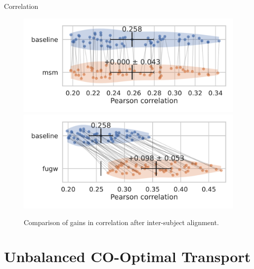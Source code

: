 \documentclass{beamer}
\begin{document}
\begin{frame}{Correlation}

  \begin{figure}
    \centering
    \includegraphics[width=0.49\linewidth, keepaspectratio=true]{OT_new/fsaverage5_alignment_correlation_gain_msm.pdf}
    \includegraphics[width=0.49\linewidth, keepaspectratio=true]{OT_new/fsaverage5_alignment_correlation_gain_fugw.pdf}
    \caption*{\scriptsize{Comparison of gains in correlation after inter-subject alignment.}}
  \end{figure}
\end{frame}

\section{Unbalanced CO-Optimal Transport}
\end{document}
